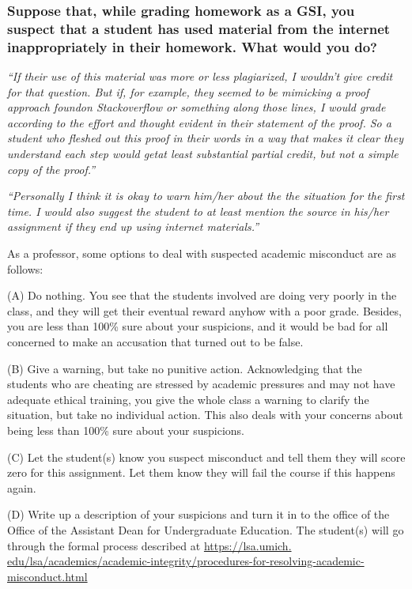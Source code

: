 \documentclass[12pt]{beamer}
\newcommand\ans[1]{{\it ``#1''}}
\begin{document}
\begin{frame} %

\frametitle{Suppose that, while grading homework as a GSI, you suspect that a student has used material from the internet inappropriately in their homework. What would you do?}

\ans{If their use of this material was more or less plagiarized, I wouldn’t give credit for that question.  But if, for example, they seemed to be mimicking a proof approach foundon Stackoverflow or something along those lines, I would grade according to the effort and thought evident in their statement of the proof.  So a student who fleshed out this proof in their words in a way that makes it clear they understand each step would getat least substantial partial credit, but not a simple copy of the proof.}

\ans{Personally I think it is okay to warn him/her about the the situation for the first time. I would also suggest the student to at least mention the source in his/her assignment if they end up using internet materials.}



\end{frame}
\begin{frame}

As a professor, some options to deal with suspected academic misconduct are as follows:

(A) Do nothing. You see that the students involved are doing very poorly in the class, and they will get their eventual reward anyhow with a poor grade. Besides, you are less than 100\% sure about your suspicions, and it would be bad for all concerned to make an accusation that turned out to be false.

(B) Give a warning, but take no punitive action. Acknowledging that the students who are cheating are stressed by academic pressures and may not have adequate ethical training, you give the whole class a warning to clarify the situation, but take no individual action. This also deals with your concerns about being less than  100\% sure about your suspicions.

\end{frame}
\begin{frame}

(C) Let the student(s) know you suspect misconduct and tell them they will score zero for this assignment. Let them know they will fail the course if this happens again.

(D) Write up a description of your suspicions and turn it in to the office of the Office of the Assistant Dean for Undergraduate Education. The student(s) will go through the formal process described at
\url{https://lsa.umich. edu/lsa/academics/academic-integrity/procedures-for-resolving-academic-misconduct.html}

\end{frame}
\end{document}
